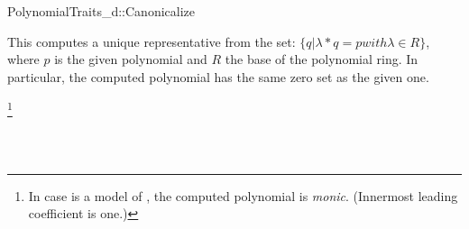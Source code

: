 \begin{ccRefConcept}{PolynomialTraits_d::Canonicalize}

\ccDefinition

This  computes a unique representative from the set: 
$\{ q | \lambda * q = p with \lambda \in R  \}$, where $p$ is the given polynomial and 
$R$ the base of the polynomial ring. 
In particular, the computed polynomial has the same zero set as the given one.

\footnote{In case  is a model of , 
the computed polynomial is {\em monic}. (Innermost leading coefficient is one.)}

\ccRefines 


\ccTypes


\ccGlue
{}

\ccOperations





\ccSeeAlso

\\
\\

\end{ccRefConcept}